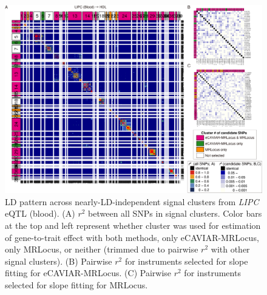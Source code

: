 \documentclass[11pt]{article}
\begin{document}
\begin{figure}[!ht]
  \centering
  \includegraphics[width=\textwidth]{figs/region/heatmap_eQTLbase.Blood_LIPC_HDL.20210114.png}
  \caption{LD pattern across nearly-LD-independent signal clusters
    from \emph{LIPC} eQTL (blood).
    (A) $r^2$ between all SNPs in signal clusters. Color bars at the
    top and left represent whether cluster was used for estimation of
    gene-to-trait effect with both methods, only eCAVIAR-MRLocus, only
    MRLocus, or neither (trimmed due to pairwise $r^2$ with other
    signal clusters). (B) Pairwise $r^2$ for instruments selected for
    slope fitting for eCAVIAR-MRLocus. (C) Pairwise $r^2$ for
    instruments selected for slope fitting for MRLocus.}
\end{figure}
\end{document}
